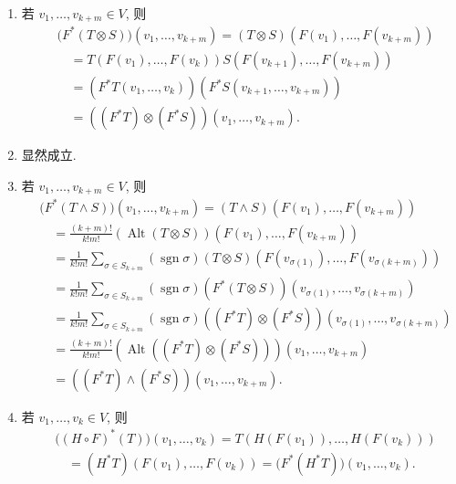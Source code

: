 \begin{description}[font=\normalfont,leftmargin=2em,labelwidth=1.5em]
\begin{enumerate}[label=(\arabic*),ref=\arabic*,leftmargin=*]
\item 若 $v_1,\ldots,v_{k+m}\in V$, 则
\begin{align*}
  &\bigl(F^*(T\otimes S)\bigr)(v_1,\ldots,v_{k+m})
  =(T\otimes S)(F(v_1),\ldots,F(v_{k+m}))\\
  &\quad=T(F(v_1),\ldots,F(v_k))S(F(v_{k+1}),\ldots,F(v_{k+m}))\\
  &\quad=(F^*T(v_1,\ldots,v_k))(F^*S(v_{k+1},\ldots,v_{k+m}))\\
  &\quad=((F^*T)\otimes(F^*S))(v_1,\ldots,v_{k+m}).
\end{align*}
\item 显然成立.
\item 若 $v_1,\ldots,v_{k+m}\in V$, 则
\begin{align*}
  &\bigl(F^*(T\wedge S)\bigr)(v_1,\ldots,v_{k+m})
  =(T\wedge S)(F(v_1),\ldots,F(v_{k+m}))\\
  &\quad=\frac{(k+m)!}{k!m!}(\operatorname{Alt}(T\otimes S))(F(v_1),\ldots,F(v_{k+m}))\\
  &\quad=\frac{1}{k!m!}\sum_{\sigma\in S_{k+m}}(\operatorname{sgn}\sigma)
       (T\otimes S)(F(v_{\sigma(1)}),\ldots,F(v_{\sigma(k+m)}))\\
  &\quad=\frac{1}{k!m!}\sum_{\sigma\in S_{k+m}}(\operatorname{sgn}\sigma)
       (F^*(T\otimes S))(v_{\sigma(1)},\ldots,v_{\sigma(k+m)})\\
  &\quad=\frac{1}{k!m!}\sum_{\sigma\in S_{k+m}}(\operatorname{sgn}\sigma)
       ((F^*T)\otimes(F^*S))(v_{\sigma(1)},\ldots,v_{\sigma(k+m)})\\
  &\quad=\frac{(k+m)!}{k!m!}(\operatorname{Alt}((F^*T)\otimes(F^*S)))(v_1,\ldots,v_{k+m})\\
  &\quad=((F^*T)\wedge(F^*S))(v_1,\ldots,v_{k+m}).
\end{align*}
\item 若 $v_1,\ldots,v_k\in V$, 则
\begin{align*}
  &\bigl((H\circ F)^*(T)\bigr)(v_1,\ldots,v_k)
  =T(H(F(v_1)),\ldots,H(F(v_k)))\\
  &\quad=(H^*T)(F(v_1),\ldots,F(v_k))=\bigl(F^*(H^*T)\bigr)(v_1,\ldots,v_k).
\end{align*}
\end{enumerate}
\end{description}
